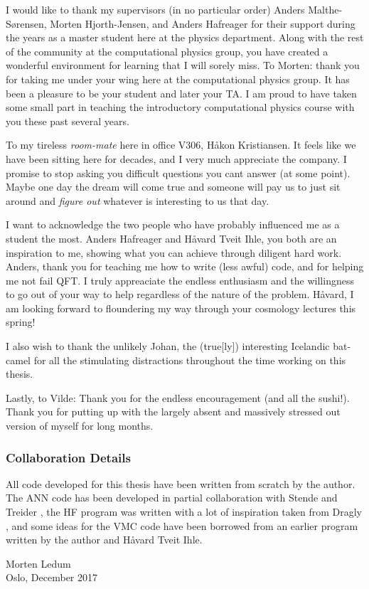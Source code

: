 \documentclass[twoside,english]{uiofysmaster}
\begin{document}
\begin{acknowledgements}
  I would like to thank my supervisors (in no particular order) Anders Malthe-Sørensen, Morten Hjorth-Jensen, and Anders Hafreager for their support during the years as a master student here at the physics department. Along with the rest of the community at the computational physics group, you have created a wonderful environment for learning that I will sorely miss. To Morten: thank you for taking me under your wing here at the computational physics group. It has been a pleasure to be your student and later your TA. I am proud to have taken some small part in teaching the introductory computational physics course with you these past several years. 

  To my tireless \emph{room-mate} here in office V306, Håkon Kristiansen. It feels like we have been sitting here for decades, and I very much appreciate the company. I promise to stop asking you difficult questions you cant answer (at some point). Maybe one day the dream will come true and someone will pay us to just sit around and \emph{figure out} whatever is interesting to us that day.

  I want to acknowledge the two people who have probably influenced me as a student the most. Anders Hafreager and Håvard Tveit Ihle, you both are an inspiration to me, showing what you can achieve through diligent hard work. Anders, thank you for teaching me how to write (less awful) code, and for helping me not fail QFT. I truly appreaciate the endless enthusiasm and the willingness to go out of your way to help regardless of the nature of the problem. Håvard, I am looking forward to floundering my way through your cosmology lectures this spring!

  I also wish to thank the unlikely Johan, the (true[ly]) interesting Icelandic bat-camel for all the stimulating distractions throughout the time working on this thesis.

  Lastly, to Vilde: Thank you for the endless encouragement (and all the sushi!). Thank you for putting up with the largely absent and massively stressed out version of myself for long months.

  \subsubsection*{Collaboration Details}
  All code developed for this thesis have been written from scratch by the author. The ANN code has been developed in partial collaboration with Stende \cite{stende} and Treider \cite{treider}, the HF program was written with a lot of inspiration taken from Dragly \cite{dragly}, and some ideas for the VMC code have been borrowed from an earlier program written by the author and Håvard Tveit Ihle.

  \begin{flushright}
  Morten Ledum \\ Oslo, December 2017
  \end{flushright}

\end{acknowledgements}
\end{document}
